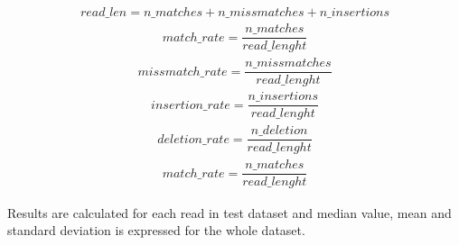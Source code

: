 \documentclass[times, utf8, diplomski, numeric, english]{fer}
\begin{document}
\begin{equation}
\begin{gathered}
read\_len =  n\_matches + n\_missmatches + n\_insertions 
\end{gathered}
\end{equation}
\begin{equation}
\begin{gathered}
match\_rate = \dfrac{n\_matches}{read\_lenght}
\end{gathered}
\end{equation}
\begin{equation}
\begin{gathered}
missmatch\_rate = \dfrac{n\_missmatches}{read\_lenght}
\end{gathered}
\end{equation}
\begin{equation}
\begin{gathered}
insertion\_rate = \dfrac{n\_insertions}{read\_lenght}
\end{gathered}
\end{equation}
\begin{equation}
\begin{gathered}
deletion\_rate = \dfrac{n\_deletion}{read\_lenght}
\end{gathered}
\end{equation}
\begin{equation}
\begin{gathered}
match\_rate = \dfrac{n\_matches}{read\_lenght}
\end{gathered}
\end{equation}

Results are calculated for each read in test dataset and median value, mean and standard deviation is expressed for the whole dataset.
\end{document}
